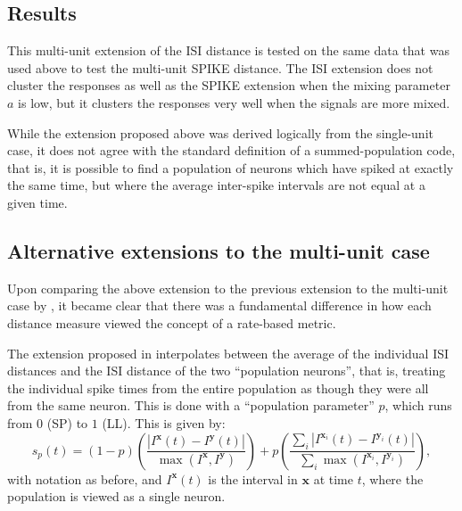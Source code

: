 \subsection{Results}
This multi-unit extension of the ISI distance is tested on the same data that was used above to test the multi-unit SPIKE distance. The ISI extension does not cluster the responses as well as the SPIKE extension when the mixing parameter $a$ is low, but it clusters the responses very well when the signals are more mixed.

While the extension proposed above was derived logically from the single-unit case, it does not agree with the standard definition of a summed-population code, that is, it is possible to find a population of neurons which have spiked at exactly the same time, but where the average inter-spike intervals are not equal at a given time.

\subsection{Alternative extensions to the multi-unit case}

Upon comparing the above extension to the previous extension to the multi-unit case by \citet{KreuzEtAl2009a}, it became clear that there was a fundamental difference in how each distance measure viewed the concept of a rate-based metric.


The extension proposed in \citep{KreuzEtAl2009a} interpolates between the average of the individual ISI distances and the ISI distance of the two ``population neurons'', that is, treating the individual spike times from the entire population as though they were all from the same neuron.  This is done with a ``population parameter'' $p$, which runs from $0$ (SP) to $1$ (LL).  This is given by:
\begin{equation}
\label{pop}
s_p(t) = (1-p)\left( \frac{ | I^{\mathbf{x}}(t) - I^{\mathbf{y}}(t) |}{ \max (I^{\mathbf{x}},I^{\mathbf{y}})}\right) + p\left( \frac{\sum_i | I^{\mathbf{x}_i}(t) - I^{\mathbf{y}_i}(t) |}{\sum_i \max (I^{\mathbf{x}_i},I^{\mathbf{y}_i})} \right),
\end{equation}
with notation as before, and $I^{\mathbf{x}}(t)$ is the interval in $\mathbf{x}$ at time $t$, where the population is viewed as a single neuron.

%


